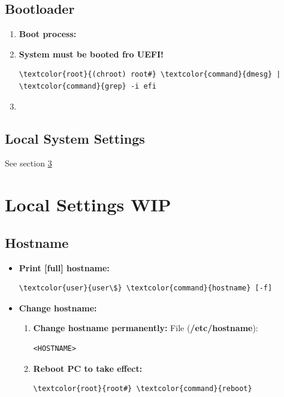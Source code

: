 \documentclass[10pt, a4paper, onecolumn, oneside, titlepage, openany]{book}
\begin{document}
\section{Bootloader}
\begin{enumerate}
    \item \textbf{Boot process:}
\newline {}
    \item \textbf{System must be booted fro UEFI!}
\begin{Verbatim}[commandchars=\\\{\}]
\textcolor{root}{(chroot) root#} \textcolor{command}{dmesg} | \textcolor{command}{grep} -i efi
\end{Verbatim}
    \item \textbf{}
\end{enumerate}

\section{Local System Settings}
See section \ref{section:local_settings}


\chapter{Local Settings WIP}
\label{section:local_settings}
\section{Hostname}
\begin{itemize}
    \item \textbf{Print [full] hostname:}
\begin{Verbatim}[commandchars=\\\{\}]
\textcolor{user}{user\$} \textcolor{command}{hostname} [-f]
\end{Verbatim}
    \item \textbf{Change hostname:}
    \begin{enumerate}
        \item \textbf{Change hostname permanently:}
\newline File (\textbf{\textcolor{file}{/etc/hostname}}):
\begin{verbatim}
<HOSTNAME>
\end{verbatim}
    \item \textbf{Reboot PC to take effect:}
\begin{Verbatim}[commandchars=\\\{\}]
\textcolor{root}{root#} \textcolor{command}{reboot}
\end{Verbatim}
    \end{enumerate}
\end{itemize}
\end{document}
